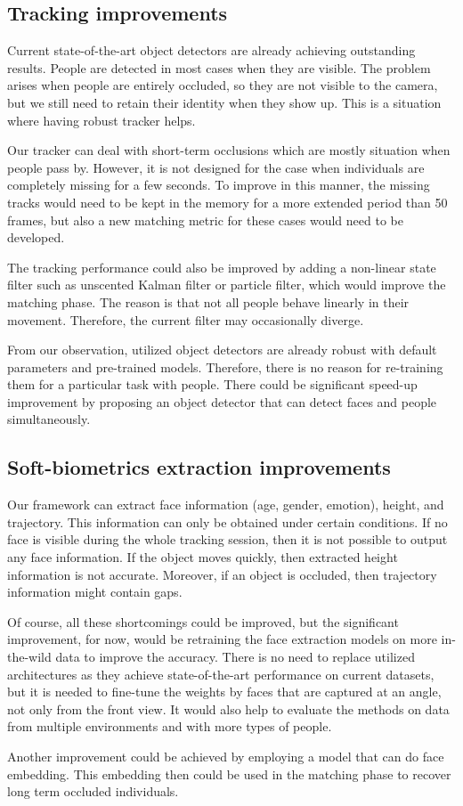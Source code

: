     \subsection{Tracking improvements}
        Current state-of-the-art object detectors are already achieving outstanding results. People are detected in most cases when they are visible. The problem arises when people are entirely occluded, so they are not visible to the camera, but we still need to retain their identity when they show up. This is a situation where having robust tracker helps. 
        
        Our tracker can deal with short-term occlusions which are mostly situation when people pass by. However, it is not designed for the case when individuals are completely missing for a few seconds. To improve in this manner, the missing tracks would need to be kept in the memory for a more extended period than 50 frames, but also a new matching metric for these cases would need to be developed.
        
        The tracking performance could also be improved by adding a non-linear state filter such as unscented Kalman filter or particle filter, which would improve the matching phase. The reason is that not all people behave linearly in their movement. Therefore, the current filter may occasionally diverge.

        From our observation, utilized object detectors are already robust with default parameters and pre-trained models. Therefore, there is no reason for re-training them for a particular task with people. There could be significant speed-up improvement by proposing an object detector that can detect faces and people simultaneously.

    \subsection{Soft-biometrics extraction improvements}
        Our framework can extract face information (age, gender, emotion), height, and trajectory. This information can only be obtained under certain conditions. If no face is visible during the whole tracking session, then it is not possible to output any face information. If the object moves quickly, then extracted height information is not accurate. Moreover, if an object is occluded, then trajectory information might contain gaps.
        
        Of course, all these shortcomings could be improved, but the significant improvement, for now, would be retraining the face extraction models on more in-the-wild data to improve the accuracy. There is no need to replace utilized architectures as they achieve state-of-the-art performance on current datasets, but it is needed to fine-tune the weights by faces that are captured at an angle, not only from the front view. It would also help to evaluate the methods on data from multiple environments and with more types of people.
        
        Another improvement could be achieved by employing a model that can do face embedding. This embedding then could be used in the matching phase to recover long term occluded individuals. 